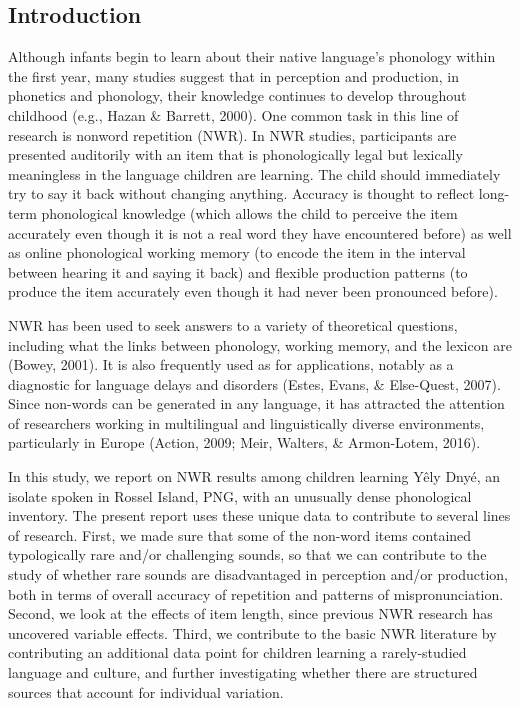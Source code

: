 \documentclass[english,,man,floatsintext]{apa6}
\begin{document}
\hypertarget{introduction}{%
\subsection{Introduction}\label{introduction}}

Although infants begin to learn about their native language's phonology within the first year, many studies suggest that in perception and production, in phonetics and phonology, their knowledge continues to develop throughout childhood (e.g., Hazan \& Barrett, 2000). One common task in this line of research is nonword repetition (NWR). In NWR studies, participants are presented auditorily with an item that is phonologically legal but lexically meaningless in the language children are learning. The child should immediately try to say it back without changing anything. Accuracy is thought to reflect long-term phonological knowledge (which allows the child to perceive the item accurately even though it is not a real word they have encountered before) as well as online phonological working memory (to encode the item in the interval between hearing it and saying it back) and flexible production patterns (to produce the item accurately even though it had never been pronounced before).

NWR has been used to seek answers to a variety of theoretical questions, including what the links between phonology, working memory, and the lexicon are (Bowey, 2001). It is also frequently used as for applications, notably as a diagnostic for language delays and disorders (Estes, Evans, \& Else-Quest, 2007). Since non-words can be generated in any language, it has attracted the attention of researchers working in multilingual and linguistically diverse environments, particularly in Europe (Action, 2009; Meir, Walters, \& Armon-Lotem, 2016).

In this study, we report on NWR results among children learning Yêly Dnyé, an isolate spoken in Rossel Island, PNG, with an unusually dense phonological inventory. The present report uses these unique data to contribute to several lines of research. First, we made sure that some of the non-word items contained typologically rare and/or challenging sounds, so that we can contribute to the study of whether rare sounds are disadvantaged in perception and/or production, both in terms of overall accuracy of repetition and patterns of mispronunciation. Second, we look at the effects of item length, since previous NWR research has uncovered variable effects. Third, we contribute to the basic NWR literature by contributing an additional data point for children learning a rarely-studied language and culture, and further investigating whether there are structured sources that account for individual variation.
\end{document}

